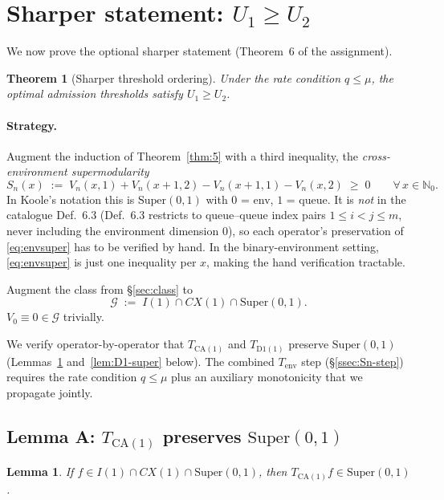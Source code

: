 \documentclass[11pt,a4paper]{article}
\newcommand{\N}{\mathbb{N}}
\newcommand{\Tenv}{T_{\mathrm{env}}}
\newcommand{\Tca}{T_{\mathrm{CA}(1)}}
\newcommand{\Td}{T_{\mathrm{D1}(1)}}
\newcommand{\Cx}{CX}
\newcommand{\Iclass}{I}
\newtheorem{lemma}{Lemma}
\newtheorem{theorem}{Theorem}
\theoremstyle{definition}
\begin{document}
\section{Sharper statement: $U_1 \ge U_2$}
\label{sec:thm6}

We now prove the optional sharper statement (Theorem~6 of the
assignment).

\begin{theorem}[Sharper threshold ordering]
\label{thm:6}
Under the rate condition $q \le \mu$, the optimal admission thresholds
satisfy $U_1 \ge U_2$.
\end{theorem}

\paragraph{Strategy.}
Augment the induction of Theorem~\ref{thm:5} with a third
inequality, the \emph{cross-environment supermodularity}
\begin{equation}
\label{eq:envsuper}
S_n(x) \;:=\; V_n(x, 1) + V_n(x + 1, 2) - V_n(x + 1, 1) - V_n(x, 2)
\;\ge\; 0 \qquad \forall\, x \in \N_0.
\end{equation}
In Koole's notation this is $\mathrm{Super}(0, 1)$ with $0$ = env,
$1$ = queue. It is \emph{not} in the catalogue Def.~6.3 (Def.~6.3
restricts to queue--queue index pairs $1 \le i < j \le m$, never
including the environment dimension $0$), so each operator's
preservation of \eqref{eq:envsuper} has to be verified by hand. In
the binary-environment setting, \eqref{eq:envsuper} is just one
inequality per $x$, making the hand verification tractable.

Augment the class from \S\ref{sec:class} to
\[
\mathcal{G} \;:=\; \Iclass(1) \cap \Cx(1) \cap \mathrm{Super}(0, 1).
\]
$V_0 \equiv 0 \in \mathcal{G}$ trivially.

We verify operator-by-operator that $\Tca$ and $\Td$ preserve
$\mathrm{Super}(0, 1)$ (Lemmas~\ref{lem:CA-super}
and~\ref{lem:D1-super} below). The combined $\Tenv$ step
(\S\ref{ssec:Sn-step}) requires the rate condition $q \le \mu$ plus
an auxiliary monotonicity that we propagate jointly.

\subsection{Lemma A: $\Tca$ preserves $\mathrm{Super}(0, 1)$}

\begin{lemma}
\label{lem:CA-super}
If $f \in \Iclass(1) \cap \Cx(1) \cap \mathrm{Super}(0, 1)$, then
$\Tca f \in \mathrm{Super}(0, 1)$.
\end{lemma}
\end{document}
